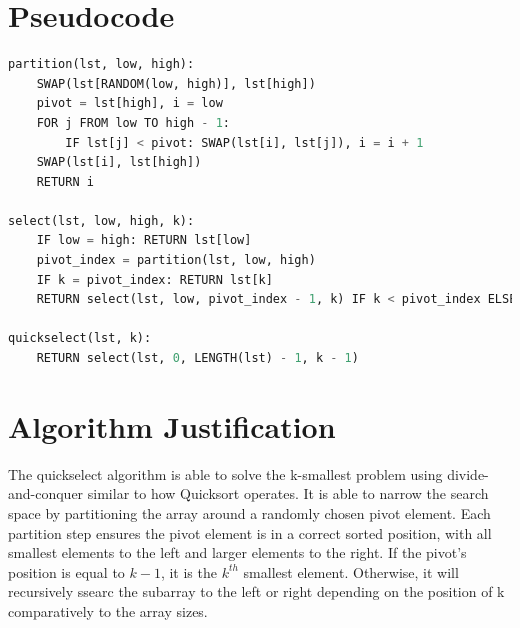 \documentclass{labReport}
\begin{document}
\section{Pseudocode}
\begin{lstlisting}[language=python]
partition(lst, low, high):
    SWAP(lst[RANDOM(low, high)], lst[high])
    pivot = lst[high], i = low
    FOR j FROM low TO high - 1:
        IF lst[j] < pivot: SWAP(lst[i], lst[j]), i = i + 1
    SWAP(lst[i], lst[high])
    RETURN i

select(lst, low, high, k):
    IF low = high: RETURN lst[low]
    pivot_index = partition(lst, low, high)
    IF k = pivot_index: RETURN lst[k]
    RETURN select(lst, low, pivot_index - 1, k) IF k < pivot_index ELSE select(lst, pivot_index + 1, high, k)

quickselect(lst, k):
    RETURN select(lst, 0, LENGTH(lst) - 1, k - 1)
\end{lstlisting}

\section{Algorithm Justification}
The quickselect algorithm is able to solve the k-smallest problem using divide-and-conquer similar to how Quicksort operates. It is able to narrow the search space by partitioning the array around a randomly chosen pivot element. Each partition step ensures the pivot element is in a correct sorted position, with all smallest elements to the left and larger elements to the right. If the pivot's position is equal to $k - 1$, it is the $k^{th}$ smallest element. Otherwise, it will recursively ssearc the subarray to the left or right depending on the position of k comparatively to the array sizes.
\end{document}
